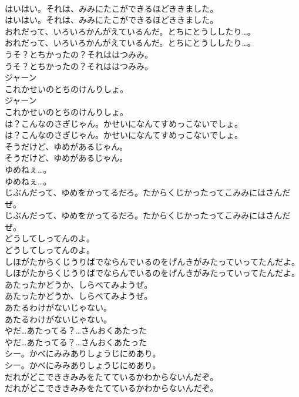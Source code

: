 \documentclass[8pt]{extreport}
\begin{document}
\begin{CJK}{UTF8}{min}
\\	はいはい。それは、みみにたこができるほどききました。
\\	はいはい。それは、みみにたこができるほどききました。
\\	おれだって、いろいろかんがえているんだ。とちにとうししたり…。
\\	おれだって、いろいろかんがえているんだ。とちにとうししたり…。
\\	うそ？とちかったの？それははつみみ。
\\	うそ？とちかったの？それははつみみ。
\\	ジャーン
\\	これかせいのとちのけんりしょ。
\\	ジャーン
\\	これかせいのとちのけんりしょ。
\\	は？こんなのさぎじゃん。かせいになんてすめっこないでしょ。
\\	は？こんなのさぎじゃん。かせいになんてすめっこないでしょ。
\\	そうだけど、ゆめがあるじゃん。
\\	そうだけど、ゆめがあるじゃん。
\\	ゆめねぇ…。
\\	ゆめねぇ…。
\\	じぶんだって、ゆめをかってるだろ。たからくじかったってこみみにはさんだぜ。
\\	じぶんだって、ゆめをかってるだろ。たからくじかったってこみみにはさんだぜ。
\\	どうしてしってんのよ。
\\	どうしてしってんのよ。
\\	しほがたからくじうりばでならんでいるのをげんきがみたっていってたんだよ。
\\	しほがたからくじうりばでならんでいるのをげんきがみたっていってたんだよ。
\\	あたったかどうか、しらべてみようぜ。
\\	あたったかどうか、しらべてみようぜ。
\\	あたるわけがないじゃない。
\\	あたるわけがないじゃない。
\\	やだ…あたってる？…さんおくあたった
\\	やだ…あたってる？…さんおくあたった
\\	シー。かべにみみありしょうじにめあり。
\\	シー。かべにみみありしょうじにめあり。
\\	だれがどこでききみみをたてているかわからないんだぞ。
\\	だれがどこでききみみをたてているかわからないんだぞ。

\end{CJK}
\end{document}
